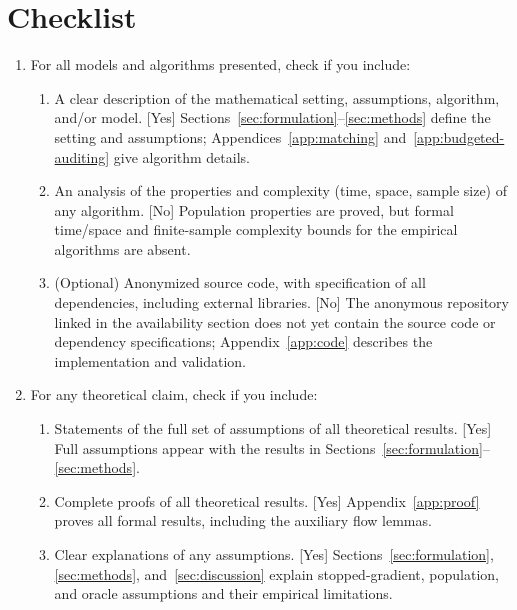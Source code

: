 \section*{Checklist}

\begin{enumerate}

  \item For all models and algorithms presented, check if you include:
  \begin{enumerate}
    \item A clear description of the mathematical setting, assumptions, algorithm, and/or model. [Yes]
    Sections~\ref{sec:formulation}--\ref{sec:methods} define the setting and assumptions; Appendices~\ref{app:matching} and~\ref{app:budgeted-auditing} give algorithm details.
    \item An analysis of the properties and complexity (time, space, sample size) of any algorithm. [No]
    Population properties are proved, but formal time/space and finite-sample complexity bounds for the empirical algorithms are absent.
    \item (Optional) Anonymized source code, with specification of all dependencies, including external libraries. [No]
    The anonymous repository linked in the availability section does not yet contain the source code or dependency specifications; Appendix~\ref{app:code} describes the implementation and validation.
  \end{enumerate}

  \item For any theoretical claim, check if you include:
  \begin{enumerate}
    \item Statements of the full set of assumptions of all theoretical results. [Yes]
    Full assumptions appear with the results in Sections~\ref{sec:formulation}--\ref{sec:methods}.
    \item Complete proofs of all theoretical results. [Yes]
    Appendix~\ref{app:proof} proves all formal results, including the auxiliary flow lemmas.
    \item Clear explanations of any assumptions. [Yes]
    Sections~\ref{sec:formulation}, \ref{sec:methods}, and~\ref{sec:discussion} explain stopped-gradient, population, and oracle assumptions and their empirical limitations.
  \end{enumerate}


\end{enumerate}
